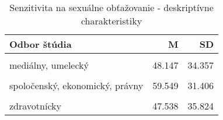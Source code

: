 \documentclass[
]{article}
\begin{document}
\begin{table}[H]

\caption{\label{tab:sensField}Senzitivita na sexuálne obťažovanie - deskriptívne charakteristiky}
\centering
\fontsize{10}{12}\selectfont
\begin{tabular}[t]{lrr}
\toprule
Odbor štúdia & M & SD\\
\midrule
\cellcolor{gray!6}{filozofický, humanitný, pedagogický, teologický} & \cellcolor{gray!6}{56.803} & \cellcolor{gray!6}{34.414}\\
mediálny, umelecký & 48.147 & 34.357\\
\cellcolor{gray!6}{prírodovedecký} & \cellcolor{gray!6}{45.857} & \cellcolor{gray!6}{34.586}\\
spoločenský, ekonomický, právny & 59.549 & 31.406\\
\cellcolor{gray!6}{technický} & \cellcolor{gray!6}{51.165} & \cellcolor{gray!6}{33.818}\\
\addlinespace
zdravotnícky & 47.538 & 35.824\\
\bottomrule
\end{tabular}
\end{table}

\begin{table}[H]

\caption{\label{tab:sensFieldReg}Senzitivita na sexuálne obťažovanie - regresný model}
\centering
{}
\end{table}
\end{document}
